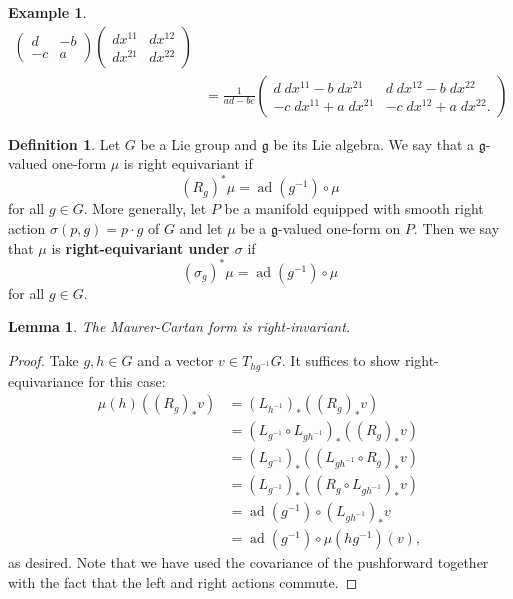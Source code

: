 \documentclass{book}
\newcommand{\fr}{\mathfrak}
\DeclareMathOperator{\ad}{ad}
\theoremstyle{plain}
\newtheorem{lem}[thm]{Lemma}
\theoremstyle{definition}
\newtheorem{defn}{Definition}
\newtheorem{exmp}{Example}
\theoremstyle{remark}
\begin{document}
\begin{exmp}
\begin{align*}
\begin{pmatrix}
            d&-b\\-c&a
        \end{pmatrix}\begin{pmatrix}
            dx^{11}&dx^{12}\\dx^{21}&dx^{22}
        \end{pmatrix}\\
        &=\frac{1}{ad-bc}\begin{pmatrix}
            d\;dx^{11}-b\;dx^{21}&d\;dx^{12}-b\;dx^{22}\\-c\;dx^{11}+a\;dx^{21}&-c\;dx^{12}+a\;dx^{22}.
        \end{pmatrix}
    \end{align*}
\end{exmp}

\begin{defn}
    Let $G$ be a Lie group and $\fr g$ be its Lie algebra. We say that a $\fr g$-valued one-form $\mu$ is right equivariant if
    \[(R_g)^*\mu=\ad(g^{-1})\circ \mu\]
    for all $g\in G$. More generally, let $P$ be a manifold equipped with smooth right action $\sigma(p,g)=p\cdot g$ of $G$ and let $\mu$ be a $\fr g$-valued one-form
    on $P$. Then we say that $\mu$ is \textbf{right-equivariant under $\sigma$} if
    \[(\sigma_g)^*\mu=\ad(g^{-1})\circ \mu\]
    for all $g\in G$.
\end{defn}

\begin{lem}
    The Maurer-Cartan form is right-invariant.
\end{lem}
\begin{proof}
    Take $g,h\in G$ and a vector $v\in T_{hg^{-1}}G$. It suffices to show right-equivariance for this case:
    \begin{align*}
        \mu(h)\left( (R_g)_*v \right)&=(L_{h^{-1}})_*\left( (R_g)_*v \right)\\
        &=(L_{g^{-1}}\circ L_{gh^{-1}})_*\left( (R_g)_*v \right)\\
        &=(L_{g^{-1}})_*\left( (L_{gh^{-1}}\circ R_g)_*v \right)\\
        &=(L_{g^{-1}})_*\left( (R_g\circ L_{gh^{-1}})_*v\right)\\
        &=\ad(g^{-1})\circ (L_{gh^{-1}})_*v\\
        &=\ad(g^{-1})\circ \mu(hg^{-1})(v),
    \end{align*}
    as desired. Note that we have used the covariance of the pushforward together with the fact that the left and right actions
    commute.
\end{proof}
\end{document}
